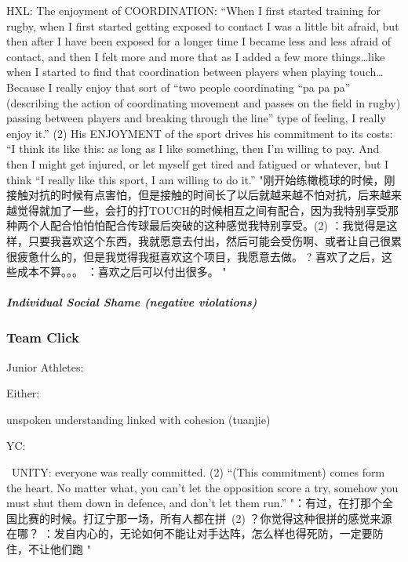 \begin{CJK}{UTF8}{gbsn}
          HXL:
          The enjoyment of COORDINATION: “When I first started training for rugby, when I first started getting exposed to contact I was a little bit afraid, but then after I have been exposed for a longer time I became less and less afraid of contact, and then I felt more and more that as I added a few more things…like when I started to find that coordination between players when playing touch…Because I really enjoy that sort of “two people coordinating “pa pa pa” (describing the action of coordinating movement and passes on the field in rugby) passing between players and breaking through the line” type of feeling, I really enjoy it.” (2) His ENJOYMENT of the sport drives his commitment to its costs: “I think its like this: as long as I like something, then I’m willing to pay.  And then I might get injured, or let myself get tired and fatigued or whatever, but I think “I really like this sport, I am willing to do it.” 	"刚开始练橄榄球的时候，刚接触对抗的时候有点害怕，但是接触的时间长了以后就越来越不怕对抗，后来越来越觉得就加了一些，会打的打TOUCH的时候相互之间有配合，因为我特别享受那种两个人配合怕怕怕配合传球最后突破的这种感觉我特别享受。(2) ：我觉得是这样，只要我喜欢这个东西，我就愿意去付出，然后可能会受伤啊、或者让自己很累很疲惫什么的，但是我觉得我挺喜欢这个项目，我愿意去做。
          ? 喜欢了之后，这些成本不算。。。
          ：喜欢之后可以付出很多。
          "
          \subparagraph{Individual Social Shame (negative violations)}


















        \subsubsection{Team Click}


  Junior Athletes:

  Either:

  unspoken understanding linked with cohesion (tuanjie)


      YC:

       UNITY: everyone was really committed. (2) “(This commitment) comes form the heart. No matter what, you can’t let the opposition score a try, somehow you must shut them down in defence, and don’t let them run.”	"：有过，在打那个全国比赛的时候。打辽宁那一场，所有人都在拼 (2) ？你觉得这种很拼的感觉来源在哪？
      ：发自内心的，无论如何不能让对手达阵，怎么样也得死防，一定要防住，不让他们跑
      "



\end{CJK}
